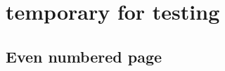 \documentclass[twoside]{article}
\begin{document}
\tableofcontents

\cleardoublepage

\section{temporary for testing}
\newpage
\subsection{Even numbered page}
%
\end{document}
